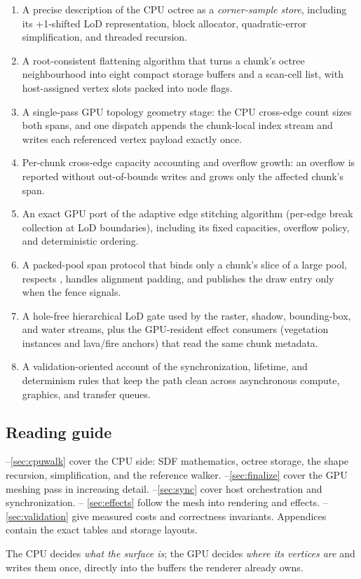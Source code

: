 \begin{enumerate}[label=\textbf{C\arabic*.},leftmargin=2.2em]
\item A precise description of the CPU octree as a \emph{corner-sample
  store}, including its +1-shifted LoD representation, block allocator,
  quadratic-error simplification, and threaded  recursion.
\item A root-consistent flattening algorithm that turns a chunk's octree
  neighbourhood into eight compact storage buffers and a scan-cell list,
  with host-assigned vertex slots packed into node flags.
\item A single-pass GPU topology geometry stage: the CPU cross-edge count
  sizes both spans, and one dispatch appends the chunk-local index stream
  and writes each referenced vertex payload exactly once.
\item Per-chunk cross-edge capacity accounting and overflow growth: an
  overflow is reported without out-of-bounds writes and grows only the
  affected chunk's span.
\item An exact GPU port of the adaptive edge stitching algorithm
  (per-edge break collection at LoD boundaries), including its fixed
  capacities, overflow policy, and deterministic ordering.
\item A packed-pool span protocol that binds only a chunk's slice of a
  large pool, respects , handles alignment
  padding, and publishes the draw entry only when the fence signals.
\item A hole-free hierarchical LoD gate used by the raster, shadow,
  bounding-box, and water streams, plus the GPU-resident effect consumers
  (vegetation instances and lava/fire anchors) that read the same chunk
  metadata.
\item A validation-oriented account of the synchronization, lifetime, and
  determinism rules that keep the path clean across asynchronous compute,
  graphics, and transfer queues.
\end{enumerate}

\subsection{Reading guide}

--\ref{sec:cpuwalk} cover the CPU side:
SDF mathematics, octree storage, the shape recursion, simplification, and
the reference walker.  --\ref{sec:finalize} cover the
GPU meshing pass in increasing detail.  --\ref{sec:sync}
cover host orchestration and synchronization.  --
\ref{sec:effects} follow the mesh into rendering and effects.
--\ref{sec:validation} give measured costs and correctness
invariants.  Appendices contain the exact tables and storage layouts.

\begin{keybox}
The CPU decides \emph{what the surface is}; the GPU decides \emph{where
its vertices are} and writes them once, directly into the buffers the
renderer already owns.
\end{keybox}
